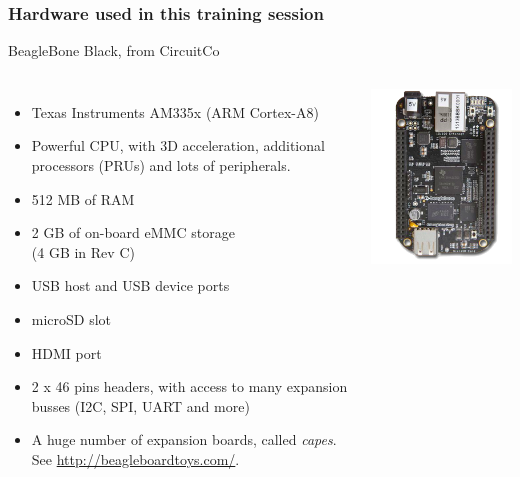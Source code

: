 \begin{frame}
\frametitle{Hardware used in this training session}
  BeagleBone Black, from CircuitCo
  \begin{columns}
    \footnotesize
    \begin{itemize}
      \item Texas Instruments AM335x (ARM Cortex-A8)
      \item Powerful CPU, with 3D acceleration, additional processors
        (PRUs) and lots of peripherals.
      \item 512 MB of RAM
      \item 2 GB of on-board eMMC storage\\
            (4 GB in Rev C)
      \item USB host and USB device ports
      \item microSD slot
      \item HDMI port
      \item 2 x 46 pins headers, with access to many expansion busses
        (I2C, SPI, UART and more)
      \item A huge number of expansion boards, called {\em capes}.
        See \url{http://beagleboardtoys.com/}.
    \end{itemize}
    \includegraphics[width=\textwidth]{slides/beagleboneblack-board/beagleboneblack.png}
  \end{columns}
\end{frame}
